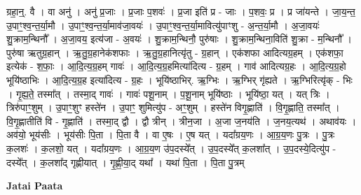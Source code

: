 \documentclass[17pt]{extarticle}
\begin{document}
ग्रहा॒न्॒. वै । वा अनु॑ । अनु॑ प्र॒जाः । प्र॒जाः प॒शवः॑ । प्र॒जा इति॑ प्र - जाः । प॒शवः॒ प्र । प्र जा॑यन्ते । जा॒य॒न्त॒ उ॒पाꣳ॒॒श्व॒न्त॒र्या॒मौ । उ॒पाꣳ॒॒श्व॒न्त॒र्या॒माव॑जा॒वयः॑ । उ॒पाꣳ॒॒श्व॒न्त॒र्या॒मावित्यु॑पाꣳशु - अ॒न्त॒र्या॒मौ । अ॒जा॒वयः॑ शु॒क्राम॒न्थिनौ᳚ । अ॒जा॒वय॒ इत्य॑जा - अ॒वयः॑ । शु॒क्राम॒न्थिनौ॒ पुरु॑षाः । शु॒क्राम॒न्थिना॒विति॑ शु॒क्रा - म॒न्थिनौ᳚ । पुरु॑षा ऋतुग्र॒हान् । ऋ॒तु॒ग्र॒हानेक॑शफाः । ऋ॒तु॒ग्र॒हानित्यृ॑तु - ग्र॒हान् । एक॑शफा आदित्यग्र॒हम् । एक॑शफा॒ इत्येक॑ - श॒फाः॒ । आ॒दि॒त्य॒ग्र॒हम् गावः॑ । आ॒दि॒त्य॒ग्र॒हमित्या॑दित्य - ग्र॒हम् । गाव॑ आदित्यग्र॒हः । आ॒दि॒त्य॒ग्र॒हो भूयि॑ष्ठाभिः । आ॒दि॒त्य॒ग्र॒ह इत्या॑दित्य - ग्र॒हः । भूयि॑ष्ठाभिर्. ऋ॒ग्भिः । ऋ॒ग्भिर् गृ॑ह्यते । ऋ॒ग्भिरित्यृ॑क् - भिः । गृ॒ह्य॒ते॒ तस्मा᳚त् । तस्मा॒द् गावः॑ । गावः॑ पशू॒नाम् । प॒शू॒नाम् भूयि॑ष्ठाः । भूयि॑ष्ठा॒ यत् । यत् त्रिः । त्रिरु॑पाꣳ॒॒शुम् । उ॒पाꣳ॒॒शुꣳ हस्ते॑न । उ॒पाꣳ॒॒ शुमित्यु॑प - अꣳ॒॒शुम् । हस्ते॑न विगृ॒ह्णाति॑ । वि॒गृ॒ह्णाति॒ तस्मा᳚त् । वि॒गृ॒ह्णातीति॑ वि - गृ॒ह्णाति॑ । तस्मा॒द् द्वौ । द्वौ त्रीन् । त्रीन॒जा । अ॒जा ज॒नय॑ति । ज॒नय॒त्यथ॑ । अथाव॑यः । अव॑यो॒ भूय॑सीः । भूय॑सीः पि॒ता । पि॒ता वै । वा ए॒षः । ए॒ष यत् । यदा᳚ग्रय॒णः । आ॒ग्र॒य॒णः पु॒त्रः । पु॒त्रः क॒लशः॑ । क॒लशो॒ यत् । यदा᳚ग्रय॒णः । आ॒ग्र॒य॒ण उ॑प॒दस्ये᳚त् । उ॒प॒दस्ये᳚त् क॒लशा᳚त् । उ॒प॒दस्ये॒दित्यु॑प - दस्ये᳚त् । क॒लशा᳚द् गृह्णीयात् । गृ॒ह्णी॒या॒द् यथा᳚ । यथा॑ पि॒ता । पि॒ता पु॒त्रम् \newline

\textbf{Jatai Paata} \newline
\end{document}
